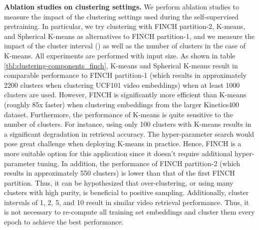 \documentclass[10pt,twocolumn,letterpaper]{article}
\begin{document}
\textbf{Ablation studies on clustering settings.} We perform ablation studies to measure the impact of the clustering settings used during the self-supervised pretraining. In particular, we try clustering with FINCH partition-2, K-means, and Spherical K-means as alternatives to FINCH partition-1, and we measure the impact of the cluster interval () as well as the number of clusters in the case of K-means. All experiments are performed with  input size. As shown in table \ref{tbl:clustering-components_finch}, K-means and Spherical K-means result in comparable performance to FINCH partition-1 (which results in approximately 2200 clusters when clustering UCF101 video embeddings) when at least 1000 clusters are used. However, FINCH is significantly more efficient than K-means (roughly 85x faster) when clustering embeddings from the larger Kinetics400 dataset. Furthermore, the performance of K-means is quite sensitive to the number of clusters. For instance, using only 100 clusters with K-means results in a significant degradation in retrieval accuracy. The hyper-parameter search would pose great challenge when deploying K-means in practice. Hence, FINCH is a more suitable option for this application since it doesn't require additional hyper-parameter tuning.
In addition, the performance of FINCH partition-2 (which results in approximately 550 clusters) is lower than that of the first FINCH partition. Thus, it can be hypothesized that over-clustering, or using many clusters with high purity, is beneficial to positive sampling. Additionally, cluster intervals of 1, 2, 5, and 10 result in similar video retrieval performance. Thus, it is not necessary to re-compute all training set embeddings and cluster them every epoch to achieve the best performance.
\end{document}

